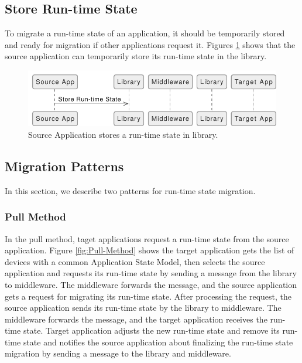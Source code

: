 \subsection{Store Run-time State}
To migrate a run-time state of an application, it should be temporarily stored and ready for migration if other applications request it. Figures \ref{fig:Store-Current-State-Source} shows that the source application can temporarily store its run-time state in the library.

\FloatBarrier \begin{figure}[H]
    \includegraphics[width=\linewidth]{../figures/Store-Current-State-Source.pdf}
    \centering
    \caption{Source Application stores a run-time state in library.}
    \label{fig:Store-Current-State-Source}
\end{figure} \FloatBarrier


\subsection{Migration Patterns}
In this section, we describe two patterns for run-time state migration.

\subsubsection{Pull Method}
In the pull method, taget applications request a run-time state from the source application. Figure \ref{fig:Pull-Method} shows the target application gets the list of devices with a common Application State Model, then selects the source application and requests its run-time state by sending a message from the library to middleware. The middleware forwards the message, and the source application gets a request for migrating its run-time state. After processing the request, the source application sends its run-time state by the library to middleware. The middleware forwards the message, and the target application receives the run-time state. Target application adjusts the new run-time state and remove its run-time state and notifies the source application about finalizing the run-time state migration by sending a message to the library and middleware. 

